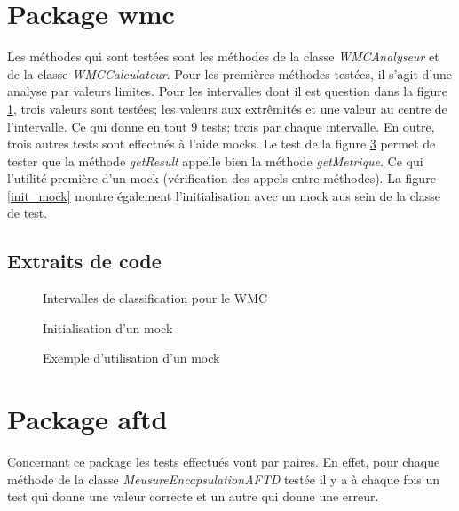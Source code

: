 \documentclass[11pt]{report}
\begin{document}
	\section{Package wmc}
		Les méthodes qui sont testées sont les méthodes de la classe \textit{WMCAnalyseur} et de la classe \textit{WMCCalculateur}. Pour les premières méthodes testées, il s'agit d'une analyse par valeurs limites. Pour les intervalles dont il est question dans la figure \ref{int}, trois valeurs sont testées; les valeurs aux extrêmités et une valeur au centre de l'intervalle. Ce qui donne en tout 9 tests; trois par chaque intervalle. En outre, trois autres tests sont effectués à l'aide mocks. Le test de la figure \ref{mock} permet de tester que la méthode \textit{getResult} appelle bien la méthode \textit{getMetrique}. Ce qui l'utilité première d'un mock (vérification des appels entre méthodes). La figure \ref{init_mock} montre également l'initialisation avec un mock aus sein de la classe de test. 
		
		\subsection{Extraits de code}
		
		\begin{figure}[h]
			\centering
			\caption{Intervalles de classification pour le WMC}
			\label{int}
		\end{figure}
		
		\begin{figure}[h]
			\centering
			\caption{Initialisation d'un mock}
			\label{mock}
		\end{figure}
		
		\begin{figure}[h]
			\centering
			\caption{Exemple d'utilisation d'un mock}
			\label{mock}
		\end{figure}
		
	\newpage
	\section{Package aftd}
		Concernant ce package les tests effectués vont par paires. En effet, pour chaque méthode de la classe \textit{MeusureEncapsulationAFTD} testée il y a à chaque fois un test qui donne une valeur correcte et un autre qui donne une erreur.
	
\end{document}
